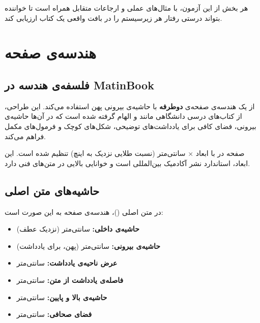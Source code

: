 \documentclass{matinbook}
\begin{document}
هر بخش از این آزمون، با مثال‌های عملی و ارجاعات متقابل همراه
است تا خواننده بتواند درستی رفتار هر زیرسیستم را در بافت
واقعی یک کتاب ارزیابی کند.

\clearpage

\tableofcontents
\clearpage

\listoffigures
\clearpage

\listoftables
\clearpage

\mainmatter
\mainmattergeometry

\chapter{هندسه‌ی صفحه}
\label{chap:geometry}

\section{فلسفه‌ی هندسه در MatinBook}
\label{sec:geometry-philosophy}

 از یک هندسه‌ی صفحه‌ی \textbf{دوطرفه} با حاشیه‌ی
بیرونی پهن استفاده می‌کند. این طراحی، از کتاب‌های درسی
دانشگاهی مانند  و  الهام گرفته شده
است که در آن‌ها حاشیه‌ی بیرونی، فضای کافی برای یادداشت‌های
توضیحی، شکل‌های کوچک و فرمول‌های مکمل فراهم می‌کند.

صفحه در  با ابعاد  × 
سانتی‌متر (نسبت طلایی نزدیک به  اینچ) تنظیم شده
است. این ابعاد، استاندارد نشر آکادمیک بین‌المللی است و
خوانایی بالایی در متن‌های فنی دارد.


\section{حاشیه‌های متن اصلی}
\label{sec:geometry-mainmatter}

در متن اصلی ()، هندسه‌ی صفحه به این صورت است:

\begin{itemize}
    \item \textbf{حاشیه‌ی داخلی:}  سانتی‌متر (نزدیک عطف)
    \item \textbf{حاشیه‌ی بیرونی:}  سانتی‌متر (پهن، برای یادداشت)
    \item \textbf{عرض ناحیه‌ی یادداشت:}  سانتی‌متر
    \item \textbf{فاصله‌ی یادداشت از متن:}  سانتی‌متر
    \item \textbf{حاشیه‌ی بالا و پایین:}  سانتی‌متر
    \item \textbf{فضای صحافی:}  سانتی‌متر
\end{itemize}
\end{document}
